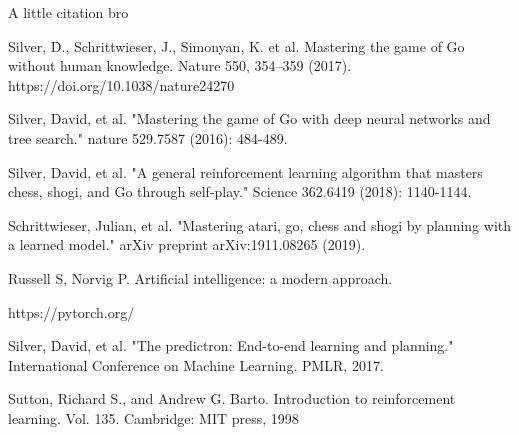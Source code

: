 
A little citation bro \cite{muzero}

\begin{thebibliography}{9}
Silver, D., Schrittwieser, J., Simonyan, K. et al. Mastering the game of Go without human knowledge. Nature 550, 354–359 (2017). https://doi.org/10.1038/nature24270

Silver, David, et al. "Mastering the game of Go with deep neural networks and tree search." nature 529.7587 (2016): 484-489.

Silver, David, et al. "A general reinforcement learning algorithm that masters chess, shogi, and Go through self-play." Science 362.6419 (2018): 1140-1144.

Schrittwieser, Julian, et al. "Mastering atari, go, chess and shogi by planning with a learned model." arXiv preprint arXiv:1911.08265 (2019).

Russell S, Norvig P. Artificial intelligence: a modern approach.

https://pytorch.org/

Silver, David, et al. "The predictron: End-to-end learning and planning." International Conference on Machine Learning. PMLR, 2017.

Sutton, Richard S., and Andrew G. Barto. Introduction to reinforcement learning. Vol. 135. Cambridge: MIT press, 1998


\end{thebibliography}
